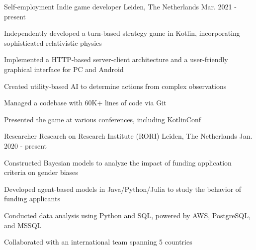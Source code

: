 

\begin{cventries}

  \cventry
    {Self-employment} %
    {Indie game developer} %
    {Leiden, The Netherlands} %
    {Mar. 2021 - present} %
    {
      \begin{cvitems} %
        \item{Independently developed a turn-based strategy game in Kotlin, incorporating sophisticated relativistic physics}
        \item{Implemented a HTTP-based server-client architecture and a user-friendly graphical interface for PC and Android}
        \item{Created utility-based AI to determine actions from complex observations}
        \item{Managed a codebase with 60K+ lines of code via Git}
        \item{Presented the game at various conferences, including KotlinConf}
      \end{cvitems}
    }

  \cventry
    {Researcher} %
    {Research on Research Institute (RORI)} %
    {Leiden, The Netherlands} %
    {Jan. 2020 - present} %
    {
      \begin{cvitems} %
        \item{Constructed Bayesian models to analyze the impact of funding application criteria on gender biases}
        \item{Developed agent-based models in Java/Python/Julia to study the behavior of funding applicants}
        \item{Conducted data analysis using Python and SQL, powered by AWS, PostgreSQL, and MSSQL}
        \item{Collaborated with an international team spanning 5 countries}
      \end{cvitems}
    }


\end{cventries}
